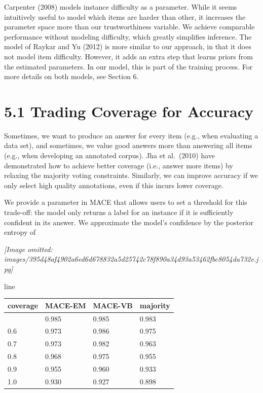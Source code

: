 \documentclass[
]{article}
\newcounter{none} %
\begin{document}
Carpenter (2008) models instance difficulty as a parameter. While it
seems intuitively useful to model which items are harder than other, it
increases the parameter space more than our trustworthiness variable. We
achieve comparable performance without modeling difficulty, which
greatly simplifies inference. The model of Raykar and Yu (2012) is more
similar to our approach, in that it does not model item difficulty.
However, it adds an extra step that learns priors from the estimated
parameters. In our model, this is part of the training process. For more
details on both models, see Section 6.

\section{5.1 Trading Coverage for
Accuracy}\label{trading-coverage-for-accuracy}

Sometimes, we want to produce an answer for every item (e.g., when
evaluating a data set), and sometimes, we value good answers more than
answering all items (e.g., when developing an annotated corpus). Jha et
al.~(2010) have demonstrated how to achieve better coverage (i.e.,
answer more items) by relaxing the majority voting constraints.
Similarly, we can improve accuracy if we only select high quality
annotations, even if this incurs lower coverage.

We provide a parameter in MACE that allows users to set a threshold for
this trade-off: the model only returns a label for an instance if it is
sufficiently confident in its answer. We approximate the model's
confidence by the posterior entropy of

\textit{[Image omitted: images/395d48af4902a6ed6d678832a5d25742c78f890a34d93a53462fbc8054da732e.jpg]}

line

{\def\LTcaptype{none} %
\begin{longtable}[]{@{}llll@{}}
\toprule\noalign{}
coverage & MACE-EM & MACE-VB & majority \\
\midrule\noalign{}
\endhead
\bottomrule\noalign{}
\endlastfoot
0.5 & 0.985 & 0.985 & 0.983 \\
0.6 & 0.973 & 0.986 & 0.975 \\
0.7 & 0.973 & 0.982 & 0.963 \\
0.8 & 0.968 & 0.975 & 0.955 \\
0.9 & 0.955 & 0.960 & 0.933 \\
1.0 & 0.930 & 0.927 & 0.898 \\
\end{longtable}
}
\end{document}

